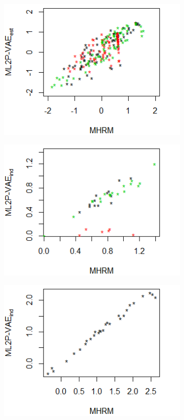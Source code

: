 \begin{figure}[h]
\begin{subfigure}{.32\textwidth}
      \includegraphics[width=.9\linewidth]{img/ml_journal_results/ecpe/vae_est_theta_ecpe.png}
    \end{subfigure}
    \begin{subfigure}{.32\textwidth}
      \centering
      \includegraphics[width=.9\linewidth]{img/ml_journal_results/ecpe/vae_ind_disc_ecpe.png}
    \end{subfigure}
    \begin{subfigure}{.32\textwidth}
      \centering
      \includegraphics[width=.9\linewidth]{img/ml_journal_results/ecpe/vae_ind_diff_ecpe.png}

\end{subfigure}
\end{figure}
